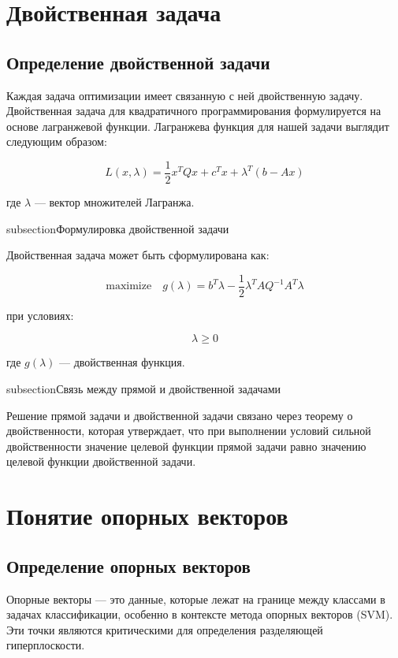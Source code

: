 \section{Двойственная задача}

\subsection{Определение двойственной задачи}

Каждая задача оптимизации имеет связанную с ней двойственную задачу. Двойственная задача для квадратичного программирования формулируется на основе лагранжевой функции. Лагранжева функция для нашей задачи выглядит следующим образом:

\[
    L(x, \lambda) = \frac{1}{2} x^T Q x + c^T x + \lambda^T (b - Ax)
\]

где \( \lambda \) — вектор множителей Лагранжа.

subsection{Формулировка двойственной задачи}

Двойственная задача может быть сформулирована как:

\[
    \text{maximize} \quad g(\lambda) = b^T \lambda - \frac{1}{2} \lambda^T A Q^{-1} A^T \lambda
\]

при условиях:

\[
    \lambda \geq 0
\]

где \( g(\lambda) \) — двойственная функция.

subsection{Связь между прямой и двойственной задачами}

Решение прямой задачи и двойственной задачи связано через теорему о двойственности, которая утверждает, что при выполнении условий сильной двойственности значение целевой функции прямой задачи равно значению целевой функции двойственной задачи.

\section{Понятие опорных векторов}

\subsection{Определение опорных векторов}

Опорные векторы — это данные, которые лежат на границе между классами в задачах классификации, особенно в контексте метода опорных векторов (SVM). Эти точки являются критическими для определения разделяющей гиперплоскости.

